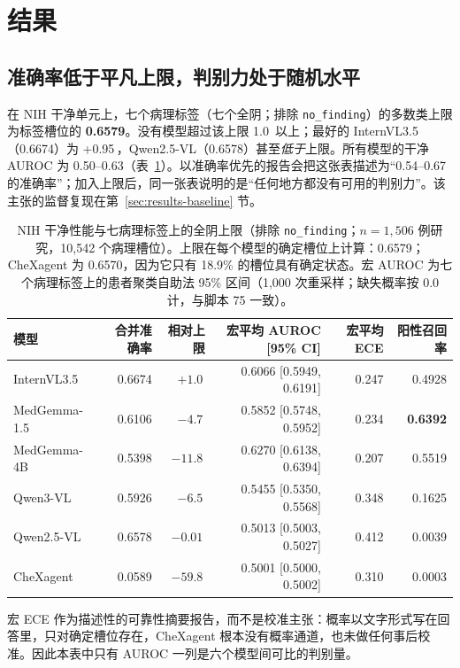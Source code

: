 \section{结果}
\label{sec:results}

\subsection{准确率低于平凡上限，判别力处于随机水平}
\label{sec:results-accuracy}

在 NIH 干净单元上，七个病理标签（七个全阴；排除 \texttt{no\_finding}）的多数类上限为标签槽位的 \textbf{0.6579}。没有模型超过该上限 1.0\,\pp{} 以上；最好的 InternVL3.5（0.6674）为 +0.95\,\pp{}，Qwen2.5-VL（0.6578）甚至\emph{低于}上限。所有模型的干净 AUROC 为 0.50--0.63（表~\ref{tab:clean}）。以准确率优先的报告会把这张表描述为``0.54--0.67 的准确率''；加入上限后，同一张表说明的是``任何地方都没有可用的判别力''。该主张的监督复现在第~\ref{sec:results-baseline} 节。

\begin{table}[t]
\centering
\small
\caption{NIH 干净性能与七病理标签上的全阴上限（排除 \texttt{no\_finding}；$n=1{,}506$ 例研究，10,542 个病理槽位）。上限在每个模型的确定槽位上计算：0.6579；CheXagent 为 0.6570，因为它只有 18.9\% 的槽位具有确定状态。宏 AUROC 为七个病理标签上的患者聚类自助法 95\% 区间（1,000 次重采样；缺失概率按 0.0 计，与脚本 75 一致）。}
\label{tab:clean}
\begin{tabular}{lrrrrr}
\toprule
模型 & 合并准确率 & 相对上限 & 宏平均 AUROC [95\% CI] & 宏平均 ECE & 阳性召回率 \\
\midrule
InternVL3.5 & 0.6674 & $+1.0$\,\pp{} & 0.6066 [0.5949, 0.6191] & 0.247 & 0.4928 \\
MedGemma-1.5 & 0.6106 & $-4.7$\,\pp{} & 0.5852 [0.5748, 0.5952] & 0.234 & \textbf{0.6392} \\
MedGemma-4B & 0.5398 & $-11.8$\,\pp{} & 0.6270 [0.6138, 0.6394] & 0.207 & 0.5519 \\
Qwen3-VL & 0.5926 & $-6.5$\,\pp{} & 0.5455 [0.5350, 0.5568] & 0.348 & 0.1625 \\
Qwen2.5-VL & 0.6578 & $\mathbf{-0.01}$\,\pp{} & 0.5013 [0.5003, 0.5027] & 0.412 & 0.0039 \\
CheXagent & 0.0589 & $-59.8$\,\pp{} & 0.5001 [0.5000, 0.5002] & 0.310 & 0.0003 \\
\bottomrule
\end{tabular}
\end{table}

宏 ECE 作为描述性的可靠性摘要报告，而不是校准主张：概率以文字形式写在回答里，只对确定槽位存在，CheXagent 根本没有概率通道，也未做任何事后校准。因此本表中只有 AUROC 一列是六个模型间可比的判别量。

